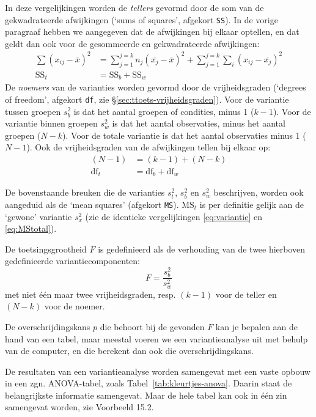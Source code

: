 \documentclass[
]{book}
\begin{document}
In deze vergelijkingen worden de \emph{tellers} gevormd door de som van de
gekwadrateerde afwijkingen (`sums of squares', afgekort \texttt{SS}). In de
vorige paragraaf hebben we aangegeven dat de afwijkingen bij elkaar
optellen, en dat geldt dan ook voor de gesommeerde en gekwadrateerde
afwijkingen:
\begin{align}
  \label{eq:SStotal}
    { \sum (x_{ij} - \overline{x})^2 } &= 
    { \sum_{j=1}^{j=k} n_j (\overline{x_j} - \overline{x})^2 } + 
    { \sum_{j=1}^{j=k} \sum_i (x_{ij} - \overline{x_j})^2 } \\
    \textrm{SS}_t &= \textrm{SS}_b + \textrm{SS}_w
\end{align}
De
\emph{noemers} van de varianties worden gevormd door de vrijheidsgraden
(`degrees of freedom', afgekort \texttt{df}, zie
§\ref{sec:ttoets-vrijheidsgraden}). Voor de variantie tussen
groepen \(s^2_b\) is dat het aantal groepen of condities, minus 1 (\(k-1\)).
Voor de variantie binnen groepen \(s^2_w\) is dat het aantal observaties,
minus het aantal groepen (\(N-k\)). Voor de totale variantie is dat het
aantal observaties minus 1 (\(N-1\)). Ook de vrijheidsgraden van de
afwijkingen tellen bij elkaar op:
\begin{align}
  \label{eq:dftotal1}
    { (N-1) } &= { (k-1) } + { (N-k) } \\
    \textrm{df}_t &= \textrm{df}_b + \textrm{df}_w
\end{align}

De bovenstaande breuken die de varianties \(s^2_t\), \(s^2_b\) en \(s^2_w\)
beschrijven, worden ook aangeduid als de `mean squares' (afgekort \texttt{MS}).
\(\textrm{MS}_{t}\) is per definitie gelijk aan de `gewone' variantie
\(s^2_x\) (zie de identieke vergelijkingen
\eqref{eq:variantie} en
\eqref{eq:MStotal}).

De toetsingsgrootheid \(F\) is gedefinieerd als de verhouding van de twee
hierboven gedefinieerde variantiecomponenten:
\begin{equation}
  \label{eq:Fratio}
    F = \frac{ s^2_b } { s^2_w }
\end{equation}
met niet één maar twee
vrijheidsgraden, resp. \((k-1)\) voor de teller en \((N-k)\) voor de noemer.

De overschrijdingskans \(p\) die behoort bij de gevonden \(F\) kan je
bepalen aan de hand van een tabel, maar meestal voeren we een
variantieanalyse uit met behulp van de computer, en die berekent dan ook
die overschrijdingskans.

De resultaten van een variantieanalyse worden samengevat met een vaste
opbouw in een zgn. ANOVA-tabel, zoals
Tabel~\ref{tab:kleurtjes-anova}. Daarin staat de belangrijkste
informatie samengevat. Maar de hele tabel kan ook in één zin samengevat
worden, zie Voorbeeld 15.2.
\end{document}

